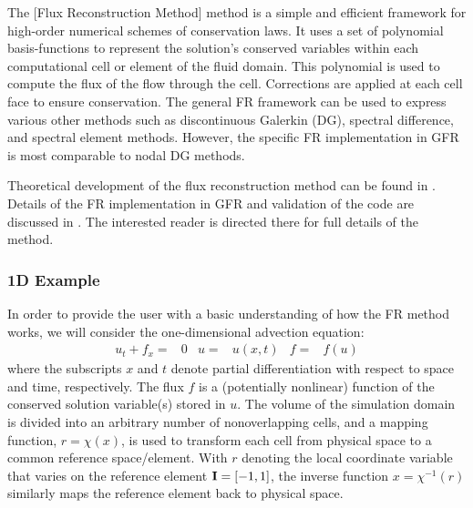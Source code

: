 The [Flux Reconstruction Method] method
is a simple and efficient framework for high-order numerical schemes
of conservation laws.
%
It uses a set of polynomial basis-functions to represent the solution's
conserved variables within each computational cell or element of the
fluid domain.
This polynomial is used to compute the flux of the flow through the cell.
Corrections are applied at each cell face to ensure conservation.
%
The general FR framework can be used to express various other methods
such as discontinuous Galerkin (DG), spectral difference, and
spectral element methods.
%
However, the specific FR implementation in GFR is most comparable to
nodal DG methods.


Theoretical development of the flux reconstruction method can be
found in .
%
Details of the FR implementation in GFR and validation of the code are discussed in
.
%
The interested reader is directed there for full details of the method.


\subsubsection{1D Example}
\label{SEC:Intro:FR:1D_Example}

In order to provide the user with a basic understanding of how the
FR method works, we will consider the one-dimensional advection
equation:
\begin{align}
  \label{EQN:1D_Advection}
  u_t + f_x =& 0
&       u   =& u(x,t)
&       f   =& f(u)
\end{align}
where the subscripts $x$ and $t$ denote partial differentiation
with respect to space and time, respectively.
The flux $f$ is a (potentially nonlinear) function of the conserved
solution variable(s) stored in $u$.
%
The volume of the simulation domain is divided into an arbitrary
number of nonoverlapping cells, and a mapping function,
  $ r = \chi (x) $,
is used to transform each cell from physical space to a common
reference space\slash element.
%
With $r$ denoting the local coordinate variable that varies on the
reference element
  $ \mathbf{I} = [-1,1] $,
the inverse function
  $ x = \chi^{-1} (r) $
similarly maps the reference element back to physical space.

